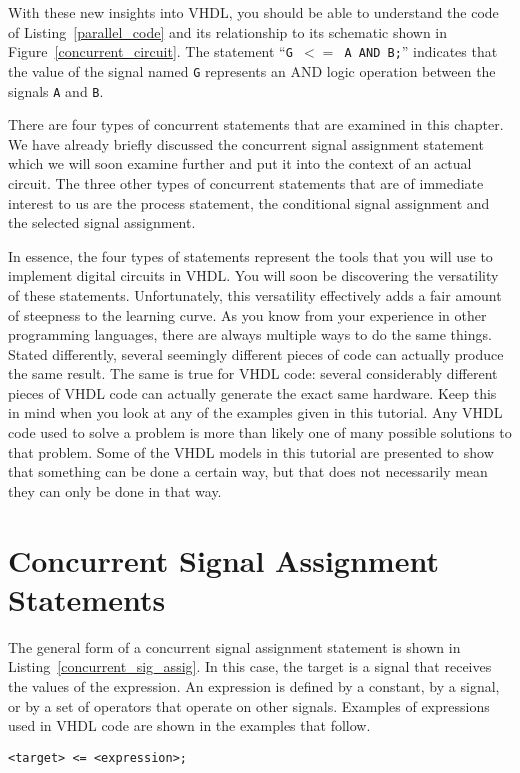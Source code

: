 With these new insights into VHDL, you should be able to understand the code of Listing~\ref{parallel_code} and its relationship to its schematic shown in Figure~\ref{concurrent_circuit}. The statement ``\texttt{G~$<=$~A~AND~B;}'' indicates that the value of the signal named \texttt{G} represents an AND logic operation between the signals \texttt{A} and \texttt{B}.

There are four types of concurrent statements that are examined in this chapter. We have already briefly discussed the concurrent signal assignment statement which we will soon examine further and put it into the context of an actual circuit. The three other types of concurrent statements that are of immediate interest to us are the process statement, the conditional signal assignment and the selected signal assignment.

In essence, the four types of statements represent the tools that you will use to implement digital circuits in VHDL. You will soon be discovering the versatility of these statements. Unfortunately, this versatility effectively adds a fair amount of steepness to the learning curve. As you know from your experience in other programming languages, there are always multiple ways to do the same things. Stated differently, several seemingly different pieces of code can actually produce the same result. The same is true for VHDL code: several considerably different pieces of VHDL code can actually generate the exact same hardware. Keep this in mind when you look at any of the examples given in this tutorial. Any VHDL code used to solve a problem is more than likely one of many possible solutions to that problem. Some of the VHDL models in this tutorial are presented to show that something can be done a certain way, but that does not necessarily mean they can only be done in that way.

\section{Concurrent Signal Assignment Statements}
The general form of a concurrent signal assignment statement is shown in Listing~\ref{concurrent_sig_assig}. In this case, the target is a signal that receives the values of the expression. An expression is defined by a constant, by a signal, or by a set of operators that operate on other signals. Examples of expressions used in VHDL code are shown in the examples that follow.

\noindent
\begin{minipage}{0.99\linewidth}
\begin{lstlisting}[label=concurrent_sig_assig, caption=Syntax for the concurrent signal assignment statement.]
<target> <= <expression>;
\end{lstlisting}
\end{minipage}

